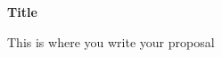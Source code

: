 \documentclass[12pt]{article} %
\begin{document}
\pagestyle{fancy}
\lhead{}
\renewcommand{\headrulewidth}{0pt}
\setlength{\headheight}{14.49998pt}

%
%


\begin{center}
    \textbf{Title}
\end{center}

This is where you write your proposal

\newpage

\end{document}
